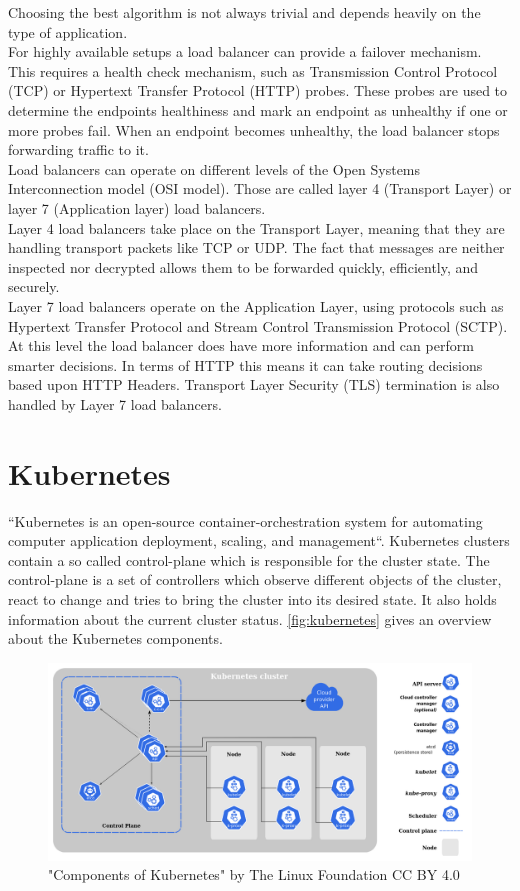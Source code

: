Choosing the best algorithm is not always trivial and depends heavily on the type of application.~\cite{ALLEN-LOAD-BALANCING}
\\
For highly available setups a load balancer can provide a failover mechanism.
This requires a health check mechanism, such as Transmission Control Protocol (TCP) or Hypertext Transfer Protocol (HTTP) probes.
These probes are used to determine the endpoints healthiness and mark an endpoint as unhealthy if one or more probes fail.
When an endpoint becomes unhealthy, the load balancer stops forwarding traffic to it.
\\
Load balancers can operate on different levels of the Open Systems Interconnection model (OSI model).
Those are called layer 4 (Transport Layer) or layer 7 (Application layer) load balancers.
\\
Layer 4 load balancers take place on the Transport Layer, meaning that they are handling transport packets like TCP or UDP.
The fact that messages are neither inspected nor decrypted allows them to be forwarded quickly, efficiently, and securely.
\\
Layer 7 load balancers operate on the Application Layer, using protocols such as Hypertext Transfer Protocol and Stream Control Transmission Protocol (SCTP).
At this level the load balancer does have more information and can perform smarter decisions.
In terms of HTTP this means it can take routing decisions based upon HTTP Headers.
Transport Layer Security (TLS) termination is also handled by Layer 7 load balancers.~\cite{NICHOLSON-LOAD-BALANCING}

\section{Kubernetes}
``Kubernetes is an open-source container-orchestration system for automating computer application deployment, scaling, and management``\cite{Kubernetes}.
Kubernetes clusters contain a so called control-plane which is responsible for the cluster state.
The control-plane is a set of controllers which observe different objects of the cluster, react to change and tries to bring the cluster into its desired state.
It also holds information about the current cluster status.
\autoref{fig:kubernetes} gives an overview about the Kubernetes components.

\begin{figure}[H]
    \centering
    \includegraphics[width=1\linewidth]{media/02/kubernetes}
    \caption{"Components of Kubernetes" by The Linux Foundation CC BY 4.0}
    \label{fig:kubernetes}
\end{figure}

